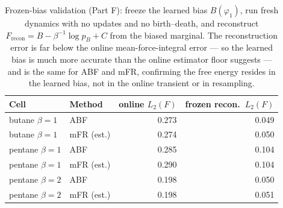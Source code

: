 \begin{table}[t]\centering\small
\caption{Frozen-bias validation (Part F): freeze the learned bias $B(\varphi_1)$, run fresh dynamics with no updates and no birth--death, and reconstruct $F_{\mathrm{recon}}=B-\beta^{-1}\log p_B+C$ from the biased marginal. The reconstruction error is far below the online mean-force-integral error --- so the learned bias is much more accurate than the online estimator floor suggests --- and is the same for ABF and mFR, confirming the free energy resides in the learned bias, not in the online transient or in resampling.}\label{tab:alk_frozen}
\begin{tabular}{llrr}\toprule
Cell & Method & online $L_2(F)$ & frozen recon.\ $L_2(F)$ \\\midrule
butane $\beta{=}1$ & ABF & 0.273 & 0.049 \\
butane $\beta{=}1$ & mFR (est.) & 0.274 & 0.050 \\
pentane $\beta{=}1$ & ABF & 0.285 & 0.104 \\
pentane $\beta{=}1$ & mFR (est.) & 0.290 & 0.104 \\
pentane $\beta{=}2$ & ABF & 0.198 & 0.050 \\
pentane $\beta{=}2$ & mFR (est.) & 0.198 & 0.051 \\
\bottomrule\end{tabular}\end{table}
